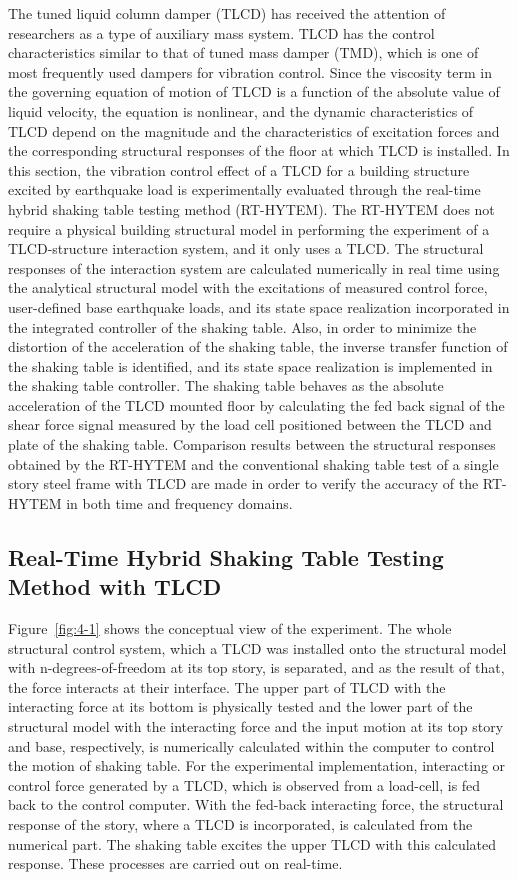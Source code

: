 The tuned liquid column damper (TLCD) has received the attention of researchers as a type of auxiliary mass system\citep{samali1998wind}. TLCD has the control characteristics similar to that of tuned mass damper (TMD), which is one of most frequently used dampers for vibration control. Since the viscosity term in the governing equation of motion of TLCD is a function of the absolute value of liquid velocity, the equation is nonlinear, and the dynamic characteristics of TLCD depend on the magnitude and the characteristics of excitation forces and the corresponding structural responses of the floor at which TLCD is installed\citep{yalla2001liquid}.
In this section, the vibration control effect of a TLCD for a building structure excited by earthquake load is experimentally evaluated through the real-time hybrid shaking table testing method (RT-HYTEM). The RT-HYTEM does not require a physical building structural model in performing the experiment of a TLCD-structure interaction system, and it only uses a TLCD. The structural responses of the interaction system are calculated numerically in real time using the analytical structural model with the excitations of measured control force, user-defined base earthquake loads, and its state space realization incorporated in the integrated controller of the shaking table. Also, in order to minimize the distortion of the acceleration of the shaking table, the inverse transfer function of the shaking table is identified, and its state space realization is implemented in the shaking table controller. The shaking table behaves as the absolute acceleration of the TLCD mounted floor by calculating the fed back signal of the shear force signal measured by the load cell positioned between the TLCD and plate of the shaking table. Comparison results between the structural responses obtained by the RT-HYTEM and the conventional shaking table test of a single story steel frame with TLCD are made in order to verify the accuracy of the RT-HYTEM in both time and frequency domains.

\subsection{Real-Time Hybrid Shaking Table Testing Method with TLCD}
Figure~\ref{fig:4-1} shows the conceptual view of the experiment. The whole structural control system, which a TLCD was installed onto the structural model with n-degrees-of-freedom at its top story, is separated, and as the result of that, the force interacts at their interface. The upper part of TLCD with the interacting force at its bottom is physically tested and the lower part of the structural model with the interacting force and the input motion at its top story and base, respectively, is numerically calculated within the computer to control the motion of shaking table. For the experimental implementation, interacting or control force generated by a TLCD, which is observed from a load-cell, is fed back to the control computer. With the fed-back interacting force, the structural response of the story, where a TLCD is incorporated, is calculated from the numerical part. The shaking table excites the upper TLCD with this calculated response. These processes are carried out on real-time.

